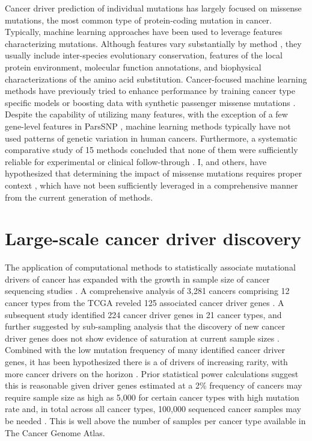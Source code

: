 Cancer driver prediction of individual mutations has largely focused on missense mutations, the most common type of protein-coding mutation in cancer. Typically, machine learning approaches have been used to leverage features characterizing mutations. Although features vary substantially by method \cite{RN32, RN33, RN35, RN36, RN39, RN29, RN37}, they usually include inter-species evolutionary conservation, features of the local protein environment, molecular function annotations, and biophysical characterizations of the amino acid substitution. Cancer-focused machine learning methods have previously tried to enhance performance by training cancer type specific models \cite{RN10, RN12} or boosting data with synthetic passenger missense mutations \cite{RN10}. Despite the capability of utilizing many features, with the exception of a few gene-level features in ParsSNP \cite{RN9}, machine learning methods typically have not used patterns of genetic variation in human cancers. Furthermore, a systematic comparative study of 15 methods concluded that none of them were sufficiently reliable for experimental or clinical follow-through \cite{RN46}. I, and others, have hypothesized that determining the impact of missense mutations requires proper context \cite{RN47, RN57}, which have not been sufficiently leveraged in a comprehensive manner from the current generation of methods.

\section{Large-scale cancer driver discovery}
\label{sec:section}

The application of computational methods to statistically associate mutational drivers of cancer has expanded with the growth in sample size of cancer sequencing studies \cite{RN99, RN105, RN14, RN87, RN158, RN12, RN13, RN54, RN96, RN98, RN154, RN43}. A comprehensive analysis of 3,281 cancers comprising 12 cancer types from the TCGA reveled 125 associated cancer driver genes \cite{RN12}.  A subsequent study identified 224 cancer driver genes in 21 cancer types, and further suggested by sub-sampling analysis that the discovery of new cancer driver genes does not show evidence of saturation at current sample sizes \cite{RN14}. Combined with the low mutation frequency of many identified cancer driver genes, it has been hypothesized there is a  of drivers of increasing rarity, with more cancer drivers on the horizon \cite{RN148, RN147}. Prior statistical power calculations suggest this is reasonable given driver genes estimated at a 2\% frequency of cancers may require sample size as high as 5,000 for certain cancer types with high mutation rate and, in total across all cancer types, 100,000 sequenced cancer samples may be needed \cite{RN14}. This is well above the number of samples per cancer type available in The Cancer Genome Atlas. 

